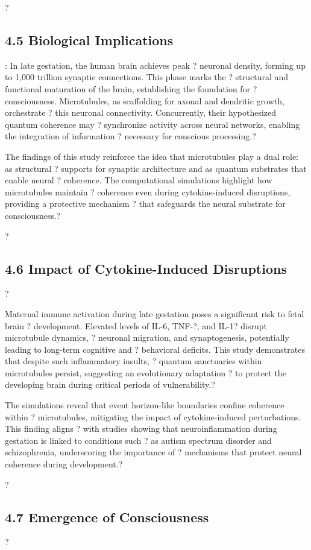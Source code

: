?\subsection{4.5 Biological Implications}: In late gestation, the human brain achieves peak ?
neuronal density, forming up to 1,000 trillion synaptic connections. This phase marks the ?
structural and functional maturation of the brain, establishing the foundation for ?
consciousness. Microtubules, as scaffolding for axonal and dendritic growth, orchestrate ?
this neuronal connectivity. Concurrently, their hypothesized quantum coherence may ?
synchronize activity across neural networks, enabling the integration of information ?
necessary for conscious processing.?

The findings of this study reinforce the idea that microtubules play a dual role: as structural ?
supports for synaptic architecture and as quantum substrates that enable neural ?
coherence. The computational simulations highlight how microtubules maintain ?
coherence even during cytokine-induced disruptions, providing a protective mechanism ?
that safeguards the neural substrate for consciousness.?

?\subsection{4.6 Impact of Cytokine-Induced Disruptions}?

Maternal immune activation during late gestation poses a significant risk to fetal brain ?
development. Elevated levels of IL-6, TNF-?, and IL-1? disrupt microtubule dynamics, ?
neuronal migration, and synaptogenesis, potentially leading to long-term cognitive and ?
behavioral deficits. This study demonstrates that despite such inflammatory insults, ?
quantum sanctuaries within microtubules persist, suggesting an evolutionary adaptation ?
to protect the developing brain during critical periods of vulnerability.?

The simulations reveal that event horizon-like boundaries confine coherence within ?
microtubules, mitigating the impact of cytokine-induced perturbations. This finding aligns ?
with studies showing that neuroinflammation during gestation is linked to conditions such ?
as autism spectrum disorder and schizophrenia, underscoring the importance of ?
mechanisms that protect neural coherence during development.?

?\subsection{4.7 Emergence of Consciousness}?

